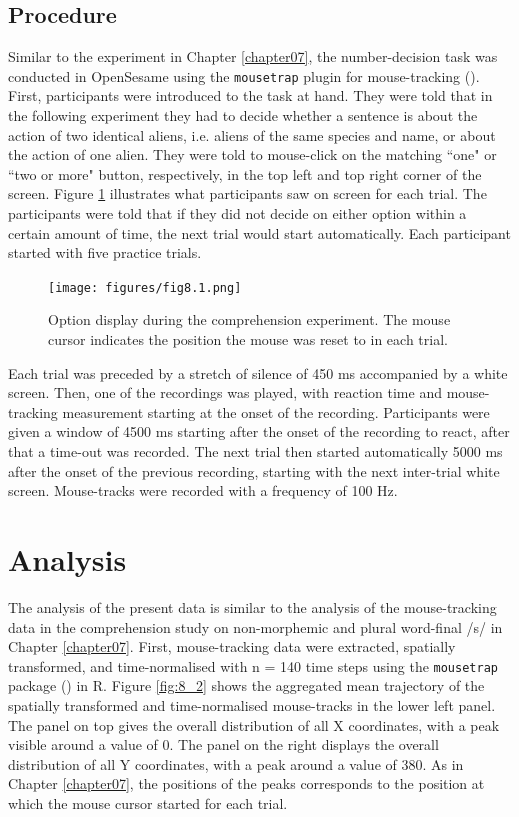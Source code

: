\subsection{Procedure}\label{section08_1_3}

Similar to the experiment in Chapter \ref{chapter07}, the number-decision task was conducted in OpenSesame using the \texttt{mousetrap} plugin for mouse-tracking (\cite{Kieslich2017}). First, participants were introduced to the task at hand. They were told that in the following experiment they had to decide whether a sentence is about the action of two identical aliens, i.e. aliens of the same species and name, or about the action of one alien. They were told to mouse-click on the matching ``one" or ``two or more" button, respectively, in the top left and top right corner of the screen. Figure \ref{fig:8_1} illustrates what participants saw on screen for each trial. The participants were told that if they did not decide on either option within a certain amount of time, the next trial would start automatically. Each participant started with five practice trials.

\begin{figure}
    \centering
    \texttt{[image: figures/fig8.1.png]}
    \caption{Option display during the comprehension experiment. The mouse cursor indicates the position the mouse was reset to in each trial.}
    \label{fig:8_1}
\end{figure}

Each trial was preceded by a stretch of silence of 450 ms accompanied by a white screen. Then, one of the recordings was played, with reaction time and mouse-tracking measurement starting at the onset of the recording. Participants were given a window of 4500 ms starting after the onset of the recording to react, after that a time-out was recorded. The next trial then started automatically 5000 ms after the onset of the previous recording, starting with the next inter-trial white screen. Mouse-tracks were recorded with a frequency of 100 Hz.

\section{Analysis}\label{section08_2}

The analysis of the present data is similar to the analysis of the mouse-tracking data in the comprehension study on non-morphemic and plural word-final /s/ in Chapter \ref{chapter07}. First, mouse-tracking data were extracted, spatially transformed, and time-normalised with n = 140 time steps using the \texttt{mousetrap} package (\cite{Kieslich2019}) in R. Figure \ref{fig:8_2} shows the aggregated mean trajectory of the spatially transformed and time-normalised mouse-tracks in the lower left panel. The panel on top gives the overall distribution of all X coordinates, with a peak visible around a value of $0$. The panel on the right displays the overall distribution of all Y coordinates, with a peak around a value of $380$. As in Chapter \ref{chapter07}, the positions of the peaks corresponds to the position at which the mouse cursor started for each trial.


